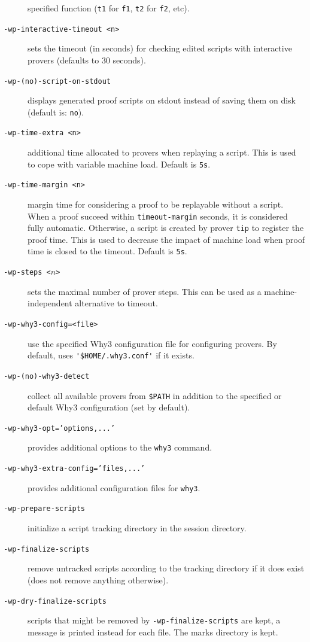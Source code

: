 \begin{description}
  specified function (\texttt{t1} for \texttt{f1}, \texttt{t2} for \texttt{f2},
  etc).
\item[\tt -wp-interactive-timeout <n>] sets the timeout (in seconds) for checking
  edited scripts with interactive provers (defaults to 30 seconds).
\item[\tt -wp-(no)-script-on-stdout] displays generated proof scripts on stdout
  instead of saving them on disk (default is: \texttt{no}).
\item[\tt -wp-time-extra <n>] additional time allocated to provers when
  replaying a script. This is used to cope with variable machine load.
  Default is \verb+5s+.
\item[\tt -wp-time-margin <n>] margin time for considering a proof to be
  replayable without a script. When a proof succeed within \verb+timeout-margin+
  seconds, it is considered fully automatic. Otherwise, a script is created
  by prover \verb+tip+ to register the proof time. This is used to decrease the
  impact of machine load when proof time is closed to the timeout.
  Default is \verb+5s+.
\item[\tt -wp-steps <$n$>] sets the maximal number of prover
  steps. This can be used as a machine-independent alternative to timeout.
\item[\tt -wp-why3-config=<file>] use the specified \textsf{Why3} configuration
  file for configuring provers. By default, uses \verb+'$HOME/.why3.conf'+
  if it exists.
\item[\tt -wp-(no)-why3-detect] collect all available provers from \verb+$PATH+
  in addition to the specified or default \textsf{Why3} configuration
  (set by default).
\item[\tt -wp-why3-opt='options,...'] provides additional options to the
  \verb+why3+ command.
\item[\tt -wp-why3-extra-config='files,...'] provides additional configuration
  files for \verb+why3+.
\item[\tt -wp-prepare-scripts] initialize a script tracking directory in the
  session directory.
\item[\tt -wp-finalize-scripts] remove untracked scripts according to the
  tracking directory if it does exist (does not remove anything otherwise).
\item[\tt -wp-dry-finalize-scripts] scripts that might be removed by
  \verb+-wp-finalize-scripts+ are kept, a message is printed instead for each
  file. The marks directory is kept.
\end{description}

